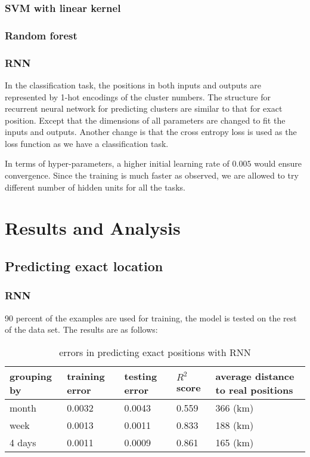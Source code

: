\documentclass[10pt,conference]{IEEEtran}
\begin{document}
\subsubsection{SVM with linear kernel}
\subsubsection{Random forest}
\subsubsection{RNN}
In the classification task, the positions in both inputs and outputs are represented by 1-hot encodings of the cluster numbers. The structure for recurrent neural network for predicting clusters are similar to that for exact position. Except that the dimensions of all parameters are changed to fit the inputs and outputs. Another change is that the cross entropy loss is used as the loss function as we have a classification task.

In terms of hyper-parameters, a higher initial learning rate of $0.005$ would ensure convergence. Since the training is much faster as observed, we are allowed to try different number of hidden units for all the tasks.

\section{Results and Analysis}
\subsection{Predicting exact location}
\subsubsection{RNN}
90 percent of the examples are used for training, the model is tested on the rest of the data set. The results are as follows:
\begin{table}[h!]
\begin{center}
\begin{tabular}{ |p{1.5cm} | p{1cm} p{1cm} p{1cm} p{2.5cm}| } 
 \hline
  grouping by &training error & testing error & $R^2$ score & average distance to real positions\\ 
 \hline
  month&0.0032 & 0.0043 & 0.559 & 366 (km)\\ 
  week&0.0013 & 0.0011 & 0.833 & 188 (km)\\ 
  4 days&0.0011 & 0.0009 & 0.861 & 165 (km)\\ 
 \hline
\end{tabular}
\end{center}
\caption{errors in predicting exact positions with RNN}
\label{table:2}
\end{table}
\end{document}
